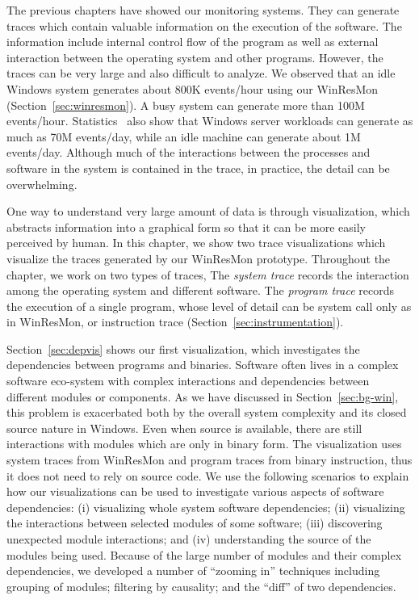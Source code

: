 
The previous chapters have showed our monitoring systems.
They can generate traces which contain valuable information on
the execution of the software.
The information include internal control flow of the program as well
as external interaction between the operating system and other programs.
However, the traces can be very large and also difficult to analyze.
We observed that an idle Windows system generates about 800K
events/hour using our WinResMon (Section~\ref{sec:winresmon}).
A busy system can generate more than 100M events/hour.
Statistics~\cite{verbowski6flight} also show that Windows
server workloads can generate as much as 70M events/day,
while an idle machine can generate about 1M events/day.
Although much of the interactions between the processes and software in the
system is contained in the trace, in practice, the detail
can be overwhelming.

One way to understand very large amount of data is through visualization,
which abstracts information into a graphical form so that it can be more
easily perceived by human.
In this chapter, we show two trace visualizations which visualize
the traces generated by our WinResMon prototype.
Throughout the chapter,
we work on two types of traces,
The {\em system trace} records the interaction among the operating system and
different software.
The {\em program trace} records the execution of a single program,
whose level of detail can be system call only as in WinResMon, or
instruction trace (Section~\ref{sec:instrumentation}).

Section~\ref{sec:depvis} shows our first visualization, which
investigates the dependencies between programs and binaries.
Software often lives in a complex software eco-system
with complex interactions and dependencies between different
modules or components.
As we have discussed in Section~\ref{sec:bg-win},
this problem is exacerbated both by the 
overall system complexity and its closed source nature in Windows.
Even when source is available, there are still interactions with
modules which are only in binary form.
The visualization uses system traces from WinResMon and
program traces from binary instruction,
thus it does not need to rely on source code.
We use the following scenarios to explain how our visualizations can
be used to investigate various aspects of software dependencies:
(i) visualizing whole system software dependencies;
(ii) visualizing the interactions between selected modules of some software;
(iii) discovering unexpected module interactions; 
and (iv) understanding the source of the modules being used.
Because of the large number of modules and their complex dependencies,
we developed a number of ``zooming in'' techniques including
grouping of modules;
filtering by causality; and
the ``diff'' of two dependencies.

